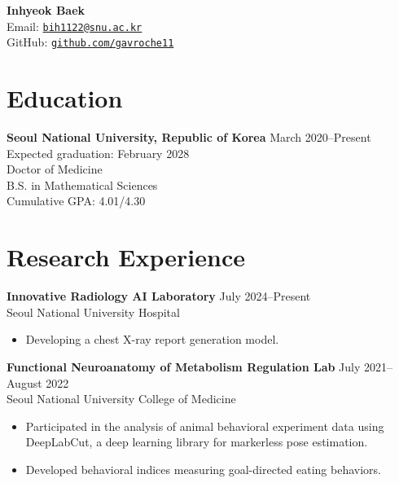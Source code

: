 \documentclass[11pt, a4paper]{article}
\begin{document}
\begin{center}
    \textbf{\Large Inhyeok Baek}\\
    \vspace{0.5mm}
    Email: \href{mailto:bih1122@snu.ac.kr}{\texttt{bih1122@snu.ac.kr}} \\
    GitHub: \href{https://github.com/gavroche11}{\texttt{github.com/gavroche11}}
\end{center}

\section*{Education}
\textbf{Seoul National University, Republic of Korea} \hfill March 2020--Present \\
\null\hfill {Expected graduation: February 2028}\smallskip \\
Doctor of Medicine\\
B.S. in Mathematical Sciences\\
Cumulative GPA: 4.01/4.30

\section*{Research Experience}
\textbf{Innovative Radiology AI Laboratory} \hfill July 2024--Present\\
Seoul National University Hospital \smallskip
\begin{itemize}[leftmargin=*, noitemsep, topsep=0pt, label=$\cdot$]
    \item Developing a chest X-ray report generation model.
\end{itemize}
\bigskip
\textbf{Functional Neuroanatomy of Metabolism Regulation Lab} \hfill July 2021--August 2022\\
Seoul National University College of Medicine \smallskip
\begin{itemize}[leftmargin=*, noitemsep, topsep=0pt, label=$\cdot$]
    \item \sloppy Participated in the analysis of animal behavioral experiment data using DeepLabCut, a deep learning library for markerless pose estimation.
    \item Developed behavioral indices measuring goal-directed eating behaviors.
\end{itemize}

\end{document}
